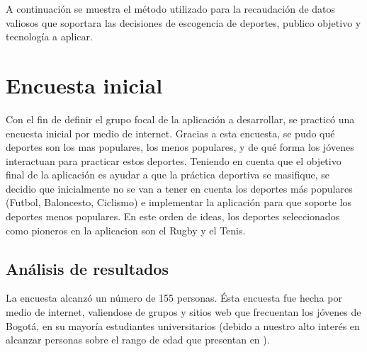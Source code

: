 A continuación se muestra el método utilizado para la recaudación de datos valiosos que soportara las decisiones de escogencia de deportes, publico objetivo y tecnología a aplicar.

\section{Encuesta inicial}

Con el fin de definir el grupo focal de la aplicación a desarrollar, se practicó una encuesta inicial por medio de internet. Gracias a esta encuesta, se pudo qué deportes son los mas populares, los menos populares, y de qué forma los jóvenes interactuan para practicar estos deportes. Teniendo en cuenta que el objetivo final de la aplicación es ayudar a que la práctica deportiva se masifique, se decidio que inicialmente no se van a tener en cuenta los deportes más populares (Futbol, Baloncesto, Ciclismo) e implementar la aplicación para que soporte los deportes menos populares. En este orden de ideas, los deportes seleccionados como pioneros en la aplicacion son el Rugby y el Tenis.

\subsection{Análisis de resultados}

La encuesta alcanzó un número de 155 personas. Ésta encuesta fue hecha por medio de internet, valiendose de grupos y sitios web que frecuentan los jóvenes de Bogotá, en su mayoría estudiantes universitarios (debido a nuestro alto interés en alcanzar personas sobre el rango de edad que presentan en \cite{user_behavior_online}).\\

